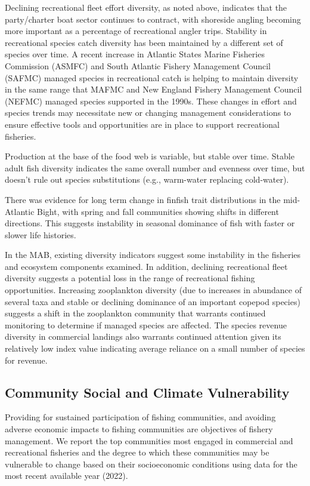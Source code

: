 \documentclass[
  10pt,
]{article}
\begin{document}
Declining recreational fleet effort diversity, as noted above, indicates that the party/charter boat sector continues to contract, with shoreside angling becoming more important as a percentage of recreational angler trips. Stability in recreational species catch diversity has been maintained by a different set of species over time. A recent increase in Atlantic States Marine Fisheries Commission (ASMFC) and South Atlantic Fishery Management Council (SAFMC) managed species in recreational catch is helping to maintain diversity in the same range that MAFMC and New England Fishery Management Council (NEFMC) managed species supported in the 1990s. These changes in effort and species trends may necessitate new or changing management considerations to ensure effective tools and opportunities are in place to support recreational fisheries.

Production at the base of the food web is variable, but stable over time. Stable adult fish diversity indicates the same overall number and evenness over time, but doesn't rule out species substitutions (e.g., warm-water replacing cold-water).

There was evidence for long term change in finfish trait distributions in the mid-Atlantic Bight, with spring and fall communities showing shifts in different directions. This suggests instability in seasonal dominance of fish with faster or slower life histories.

In the MAB, existing diversity indicators suggest some instability in the fisheries and ecosystem components examined. In addition, declining recreational fleet diversity suggests a potential loss in the range of recreational fishing opportunities. Increasing zooplankton diversity (due to increases in abundance of several taxa and stable or declining dominance of an important copepod species) suggests a shift in the zooplankton community that warrants continued monitoring to determine if managed species are affected. The species revenue diversity in commercial landings also warrants continued attention given its relatively low index value indicating average reliance on a small number of species for revenue.

\subsection{Community Social and Climate Vulnerability}\label{community-social-and-climate-vulnerability}

Providing for sustained participation of fishing communities, and avoiding adverse economic impacts to fishing communities are objectives of fishery management. We report the top communities most engaged in commercial and recreational fisheries and the degree to which these communities may be vulnerable to change based on their socioeconomic conditions using data for the most recent available year (2022).
\end{document}
